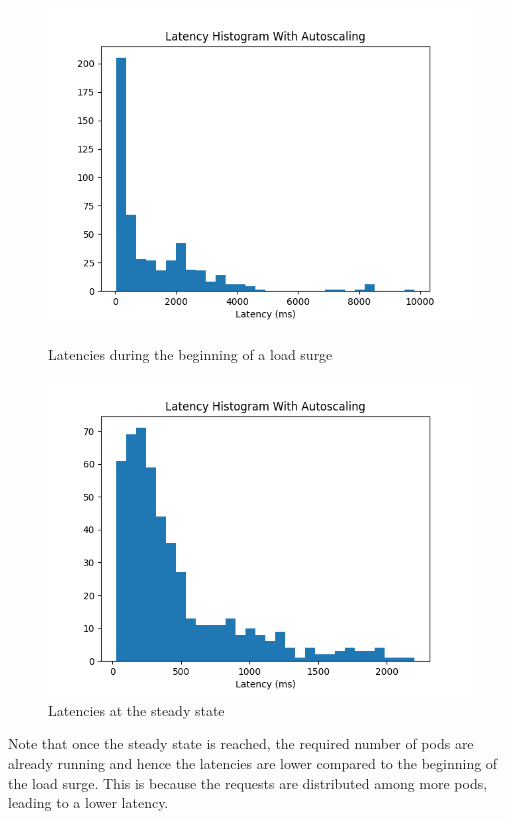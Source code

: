 \documentclass{article}
\begin{document}
\begin{itemize}
    \begin{figure}[H]
        \centering
        \begin{minipage}{0.45\textwidth}
            \centering
            \includegraphics[width=\linewidth]{../plots/latency_with_autoscaling_hist_50.png}
            \caption{Latencies during the beginning of a load surge}
        \end{minipage}\hfill
        \begin{minipage}{0.45\textwidth}
            \centering
            \includegraphics[width=\linewidth]{../plots/latency_with_autoscaling_hist_50_warm.png}
            \caption{Latencies at the steady state}
        \end{minipage}
    \end{figure}

    Note that once the steady state is reached, the required number of pods are already running and hence the latencies are lower compared to the beginning of the load surge. This is because the requests are distributed among more pods, leading to a lower latency.

\end{itemize}
\end{document}
